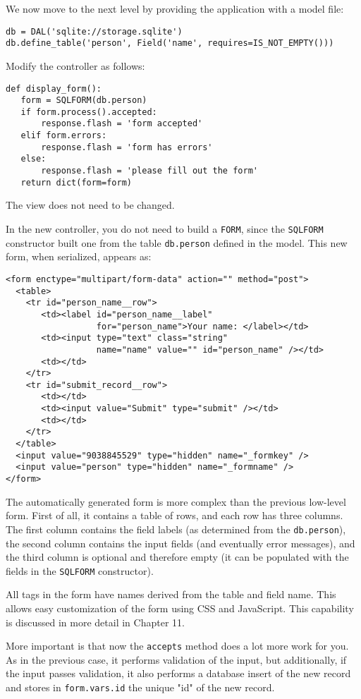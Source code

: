 \documentclass[justified,sixbynine,notoc]{tufte-book}
\def\ft{\small\tt}
\begin{document}
\begin{fullwidth}
We now move to the next level by providing the application with a model file:
\begin{lstlisting}
db = DAL('sqlite://storage.sqlite')
db.define_table('person', Field('name', requires=IS_NOT_EMPTY()))
\end{lstlisting}

Modify the controller as follows:
\begin{lstlisting}
def display_form():
   form = SQLFORM(db.person)
   if form.process().accepted:
       response.flash = 'form accepted'
   elif form.errors:
       response.flash = 'form has errors'
   else:
       response.flash = 'please fill out the form'
   return dict(form=form)
\end{lstlisting}

The view does not need to be changed.

In the new controller, you do not need to build a {\ft FORM}, since the {\ft SQLFORM} constructor built one from the table {\ft db.person} defined in the model. This new form, when serialized, appears as:
\begin{lstlisting}[keywords={}]
<form enctype="multipart/form-data" action="" method="post">
  <table>
    <tr id="person_name__row">
       <td><label id="person_name__label"
                  for="person_name">Your name: </label></td>
       <td><input type="text" class="string"
                  name="name" value="" id="person_name" /></td>
       <td></td>
    </tr>
    <tr id="submit_record__row">
       <td></td>
       <td><input value="Submit" type="submit" /></td>
       <td></td>
    </tr>
  </table>
  <input value="9038845529" type="hidden" name="_formkey" />
  <input value="person" type="hidden" name="_formname" />
</form>
\end{lstlisting}

The automatically generated form is more complex than the previous low-level form. First of all, it contains a table of rows, and each row has three columns. The first column contains the field labels (as determined from the {\ft db.person}), the second column contains the input fields (and eventually error messages), and the third column is optional and therefore empty (it can be populated with the fields in the {\ft SQLFORM} constructor).

All tags in the form have names derived from the table and field name. This allows easy customization of the form using CSS and JavaScript. This capability is discussed in more detail in Chapter 11.

More important is that now the {\ft accepts} method does a lot more work for you. As in the previous case, it performs validation of the input, but additionally, if the input passes validation, it also performs a database insert of the new record and stores in {\ft form.vars.id} the unique "id" of the new record.


\end{fullwidth}
\end{document}
